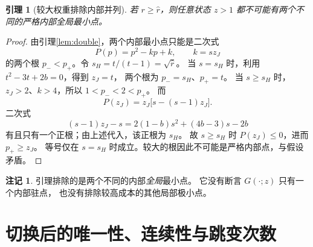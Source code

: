 \documentclass[UTF8,zihao=-4]{ctexart}
\newtheorem{lemma}[theorem]{引理}
\theoremstyle{definition}
\newtheorem{remark}[theorem]{注记}
\newcommand{\rhat}{\hat r}
\begin{document}
\begin{lemma}[较大权重排除内部并列]\label{lem:no-interior-tie}
若 $r\ge\rhat$，则任意状态 $z>1$ 都不可能有两个不同的严格内部全局最小点。
\end{lemma}
\begin{proof}
由引理\ref{lem:double}，两个内部最小点只能是二次式
\[
 P(p)=p^2-kp+k,\qquad k=sz_J
\]
的两个根 $p_-<p_+$。令 $s_H=t/(t-1)=\sqrt{\rhat}$。
当 $s=s_H$ 时，利用 $t^2-3t+2b=0$，得到 $z_J=t$，
两个根为 $p_-=s_H$、$p_+=t$。
当 $s\ge s_H$ 时，$z_J>2$、$k>4$，所以 $1<p_-<2<p_+$。
而
\[
 P(z_J)=z_J\bigl[s-(s-1)z_J\bigr].
\]
二次式
\[
 (s-1)z_J-s=2(1-b)s^2+(4b-3)s-2b
\]
有且只有一个正根；由上述代入，该正根为 $s_H$。
故 $s\ge s_H$ 时 $P(z_J)\le0$，进而 $p_+\ge z_J$。
等号仅在 $s=s_H$ 时成立。较大的根因此不可能是严格内部点，与假设矛盾。
\end{proof}

\begin{remark}
引理排除的是两个不同的内部\emph{全局}最小点。
它没有断言 $G(\cdot;z)$ 只有一个内部驻点，
也没有排除较高成本的其他局部极小点。
\end{remark}

\section{切换后的唯一性、连续性与跳变次数}
\end{document}
